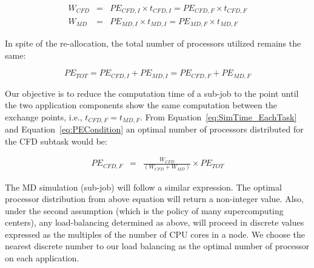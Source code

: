 \documentclass[conference,final]{IEEEtran}
\newcommand{\jhanote}[1]{ {\textcolor{red} { ***Jha: #1 }}}
\newcommand{\jhanote}[1]{}
\begin{document}
\small
\begin{eqnarray}
W_{CFD}&=&PE_{CFD,I}\times t_{CFD,I}=PE_{CFD,F}\times t_{CFD,F} \nonumber \\
W_{MD}&=&PE_{MD,I}\times t_{MD,I}=PE_{MD,F}\times t_{MD,F}
\label{eq:SimTime_EachTask}
\end{eqnarray}
\normalsize

In spite of the re-allocation, the total number of processors utilized
remains the same:

\small
\begin{equation}
PE_{TOT}=PE_{CFD,I}+PE_{MD,I}=PE_{CFD,F}+PE_{MD,F}
\label{eq:PECondition}
\end{equation}
\normalsize

Our objective is to reduce the computation time of a sub-job to the point until the
two application components show the same computation between the
exchange points, i.e., $t_{CFD,F} = t_{MD,F}$. From
Equation~\ref{eq:SimTime_EachTask} and Equation~\ref{eq:PECondition}
an optimal number of processors distributed for the CFD subtask would be:

\small
\begin{eqnarray}
PE_{CFD,F} & = & \frac {W_{CFD}} {(W_{CFD} + W_{MD})} \times PE_{TOT}
\end{eqnarray}
\normalsize

The MD simulation (sub-job) will follow a similar expression.  The
optimal processor distribution from above equation will return a
non-integer value. Also, under the second assumption (which is the
policy of many supercomputing centers), any load-balancing determined
as above, will proceed in discrete values
expressed as the multiples of the number of CPU cores in a node. We choose the nearest discrete number to our load balancing as the optimal number of processor on each application.

\end{document}
